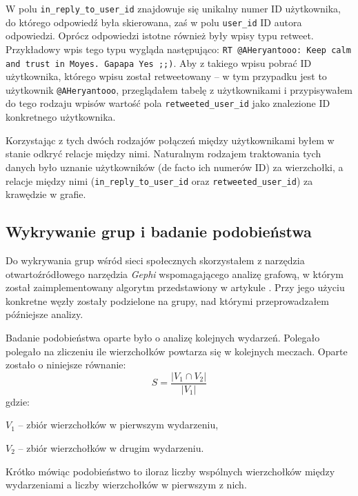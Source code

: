 W polu \texttt{in\_reply\_to\_user\_id} znajdowuje się unikalny numer ID
użytkownika, do którego odpowiedź była skierowana, zaś w polu \texttt{user\_id}
ID autora odpowiedzi. 
Oprócz odpowiedzi istotne również były wpisy typu retweet. Przykładowy wpis tego
typu wygląda następująco: \texttt{RT @AHeryantooo: Keep calm and trust in Moyes. Gapapa Yes ;;)}.
Aby z takiego wpisu pobrać ID użytkownika, którego wpisu został retweetowany -- w tym
przypadku jest to użytkownik \texttt{@AHeryantooo}, przeglądałem tabelę z użytkownikami
i przypisywałem do tego rodzaju wpisów wartość pola \texttt{retweeted\_user\_id}
jako znalezione ID konkretnego użytkownika.

Korzystając z tych dwóch rodzajów połączeń między użytkownikami byłem w stanie 
odkryć relacje między nimi. Naturalnym rodzajem traktowania tych danych było
uznanie użytkowników (de facto ich numerów ID) za wierzchołki, a relacje między nimi
(\texttt{in\_reply\_to\_user\_id} oraz \texttt{retweeted\_user\_id}) za krawędzie
w grafie.

 \subsection{Wykrywanie grup i badanie podobieństwa}
 \label{section:koncepcja-wykrywaniegrup}
Do wykrywania grup wśród sieci społecznych skorzystałem z narzędzia
otwartoźródłowego narzędzia \textit{Gephi} wspomagającego analizę grafową, w
którym został zaimplementowany algorytm przedstawiony w artykule
\cite{blondel2008fuc}. Przy jego użyciu konkretne węzły zostały podzielone
na grupy, nad którymi przeprowadzałem późniejsze analizy.



Badanie podobieństwa oparte było o analizę kolejnych wydarzeń. 
Polegało polegało na zliczeniu ile wierzchołków powtarza się w kolejnych meczach.
Oparte zostało o niniejsze równanie:
\begin{equation}
S = \frac{|V_1 \cap V_2|}{|V_1|}
\end{equation}  
gdzie:

$V_1$ -- zbiór wierzchołków w pierwszym wydarzeniu,

$V_2$ -- zbiór wierzchołków w drugim wydarzeniu.

Krótko mówiąc podobieństwo to iloraz liczby wspólnych wierzchołków między 
wydarzeniami a liczby wierzchołków w pierwszym z nich.


